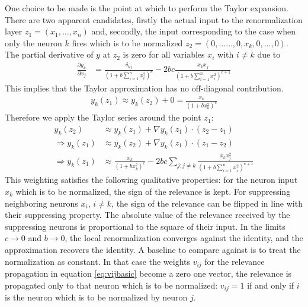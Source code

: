 \documentclass[runningheads,a4paper]{llncs}
\begin{document}
One choice to be made is the point at which to perform the Taylor expansion. There are two apparent candidates, firstly the actual input to the renormalization layer 
$z_1=(x_1, \ldots, x_n)$ and, secondly, the input corresponding to the case when only the neuron $k$ fires which is to be normalized 
$z_2=(0, ... \ldots,0, x_k, 0, \ldots, 0)$. The partial derivative of $y$ at $z_2$ is zero for all variables $x_i$ with $i \neq k$ due to 
\begin{align}
\frac{\partial y_k}{\partial x_j}& =  \frac{\delta_{kj}}{  \left(1+ b \sum_{i=1}^n x_i^2 \right)^{c}  }-2bc\frac{x_k x_j}{  \left(1+ b \sum_{i=1}^n x_i^2 \right)^{c+1}  } 
\end{align}
This implies that the Taylor approximation has no off-diagonal contribution.
\begin{align}
 y_k(z_1) \approx y_k(z_2)+0=\frac{x_k}{(1+bx_k^2)^c} \label{eq:baseline2}
\end{align}
Therefore we apply the Taylor series around the point $z_1$:
\begin{align}
y_k(z_2) &\approx y_k(z_1) +\nabla y_k(z_1) \cdot (z_2-z_1)\\
\Rightarrow  y_k(z_1) &\approx y_k(z_2)  +\nabla y_k(z_1) \cdot (z_1-z_2) \\
\Rightarrow  y_k(z_1) &\approx \frac{x_k}{(1+bx_k^2)^c}-2bc \sum_{j:j \neq k} \frac{x_k x_j^2}{  \left(1+ b \sum_{i=1}^n x_i^2 \right)^{c+1}  } \label{eq:taylor_lrn_firstorder}
\end{align}
This weighting satisfies the following qualitative properties: for the neuron input $x_k$ which is to be normalized, the sign of the relevance is kept. For suppressing neighboring neurons $x_i$, $i \neq k$, the sign of the relevance can be flipped in line with their suppressing property. The absolute value of the relevance received by the suppressing neurons is proportional to the square of their input. In the limits $c \rightarrow 0$ and $b \rightarrow 0$, the local renormalization converges against the identity, and the approximation recovers the identity. 
A baseline to compare against is to treat the normalization as constant. In that case the weights $v_{ij}$ for the relevance propagation in equation \ref{eq:vijbasic} become a zero one vector, the relevance is propagated only to that neuron which is to be normalized: $v_{ij}=1$ if and only if $i$ is the neuron which is to be normalized by neuron $j$.
\end{document}
